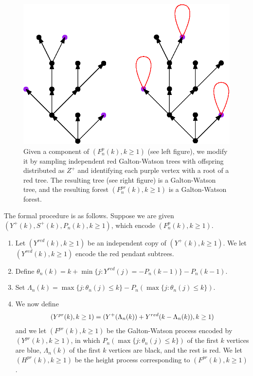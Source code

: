 \begin{figure}
    \centering
    \includegraphics[scale=0.6]{Content/Pictures/black_purple_red_tree.eps}
    \caption{Given a component of $(F^p_n(k),k\geq 1)$ (see left figure), we modify it by sampling independent red Galton-Watson trees with offspring distributed as $Z^+$ and identifying each purple vertex with a root of a red tree. The resulting tree (see right figure) is a Galton-Watson tree, and the resulting forest $(F^{pr}_n(k),k\geq 1)$ is a Galton-Watson forest.}
    \label{fig.blackpurpleredforest}
\end{figure}
The formal procedure is as follows. Suppose we are given $(Y^+(k),S^{+}(k),P_n(k),k\geq 1)$, which encode $(F^p_n(k),k\geq 1)$.
\begin{enumerate}
    \item Let $(Y^{red}(k),k\geq 1)$ be an independent copy of $(Y^+(k),k\geq 1)$. We let $(Y^{red}(k),k\geq 1)$ encode the red pendant subtrees. 
    \item Define $\theta_n(k)=k+\min\{j: Y^{red}(j)=-P_n(k-1)\}-P_n(k-1)$. 
    \item Set $\Lambda_n(k)=\max\{j:\theta_n(j)\leq k\}-P_n(\max\{j:\theta_n(j)\leq k\})$. 
    \item We now define \begin{equation}\label{eq.definitionY^{pr}}(Y^{pr}(k),k\geq 1)=(Y^+(\Lambda_n(k))+Y^{red}(k-\Lambda_n(k)),k\geq 1)\end{equation}
    and we let $(F^{pr}(k),k\geq 1)$ be the Galton-Watson process encoded by $(Y^{pr}(k),k\geq 1)$, in which $P_n(\max\{j:\theta_n(j)\leq k\})$ of the first $k$ vertices are blue, $\Lambda_n(k)$ of the first $k$ vertices are black, and the rest is red. We let $(H^{pr}(k),k\geq 1)$ be the height process corresponding to $(F^{pr}(k),k\geq 1)$.
\end{enumerate}
